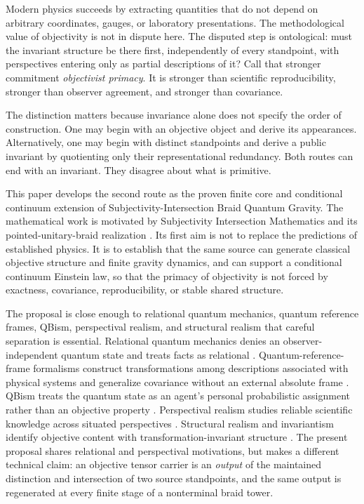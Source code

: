 \documentclass[11pt]{article}
\theoremstyle{definition}
\theoremstyle{remark}
\begin{document}
Modern physics succeeds by extracting quantities that do not depend on arbitrary coordinates, gauges, or laboratory presentations. The methodological value of objectivity is not in dispute here. The disputed step is ontological: must the invariant structure be there first, independently of every standpoint, with perspectives entering only as partial descriptions of it? Call that stronger commitment \emph{objectivist primacy}. It is stronger than scientific reproducibility, stronger than observer agreement, and stronger than covariance.

The distinction matters because invariance alone does not specify the order of construction. One may begin with an objective object and derive its appearances. Alternatively, one may begin with distinct standpoints and derive a public invariant by quotienting only their representational redundancy. Both routes can end with an invariant. They disagree about what is primitive.

This paper develops the second route as the proven finite core and conditional continuum extension of Subjectivity-Intersection Braid Quantum Gravity. The mathematical work is motivated by Subjectivity Intersection Mathematics and its pointed-unitary-braid realization \cite{watanabe2026sim,watanabe2026braid}. Its first aim is not to replace the predictions of established physics. It is to establish that the same source can generate classical objective structure and finite gravity dynamics, and can support a conditional continuum Einstein law, so that the primacy of objectivity is not forced by exactness, covariance, reproducibility, or stable shared structure.

The proposal is close enough to relational quantum mechanics, quantum reference frames, QBism, perspectival realism, and structural realism that careful separation is essential. Relational quantum mechanics denies an observer-independent quantum state and treats facts as relational \cite{rovelli1996}. Quantum-reference-frame formalisms construct transformations among descriptions associated with physical systems and generalize covariance without an external absolute frame \cite{giacomini2019,vanrietvelde2020}. QBism treats the quantum state as an agent's personal probabilistic assignment rather than an objective property \cite{fuchs2013}. Perspectival realism studies reliable scientific knowledge across situated perspectives \cite{massimi2022,massimi2023}. Structural realism and invariantism identify objective content with transformation-invariant structure \cite{weyl1952,ladyman1998}. The present proposal shares relational and perspectival motivations, but makes a different technical claim: an objective tensor carrier is an \emph{output} of the maintained distinction and intersection of two source standpoints, and the same output is regenerated at every finite stage of a nonterminal braid tower.
\end{document}
